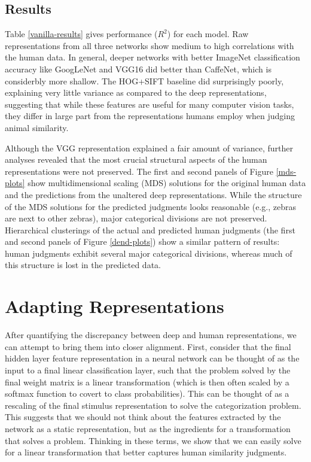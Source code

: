 \documentclass[10pt,letterpaper]{article}
\begin{document}
\subsection{Results} Table \ref{vanilla-results} gives performance ($R^{2}$) for each model. Raw representations from all three networks show medium to high correlations with the human data. In general, deeper networks with better ImageNet classification accuracy like GoogLeNet and VGG16 did better than CaffeNet, which is considerbly more shallow. The HOG+SIFT baseline did surprisingly poorly, explaining very little variance as compared to the deep representations, suggesting that while these features are useful for many computer vision tasks, they differ in large part from the representations humans employ when judging animal similarity.

Although the VGG representation explained a fair amount of variance, further analyses revealed that the most crucial structural aspects of the human representations were not preserved. The first and second panels of Figure \ref{mds-plots} show multidimensional scaling (MDS) solutions for the original human data and the predictions from the unaltered deep representations. While the structure of the MDS solutions for the predicted judgments looks reasonable (e.g., zebras are next to other zebras), major categorical divisions are not preserved. Hierarchical clusterings of the actual and predicted human judgments (the first and second panels of Figure \ref{dend-plots}) show a similar pattern of results: human judgments exhibit several major categorical divisions, whereas much of this structure is lost in the predicted data.

\section{Adapting Representations}
After quantifying the discrepancy between deep and human representations, we can attempt to bring them into closer alignment. First, consider that the final hidden layer feature representation in a neural network can be thought of as the input to a final linear classification layer, such that the problem solved by the final weight matrix is a linear transformation (which is then often scaled by a softmax function to covert to class probabilities). This can be thought of as a rescaling of the final stimulus representation to solve the categorization problem. This suggests that we should not think about the features extracted by the network as a static representation, but as the ingredients for a transformation that solves a problem. Thinking in these terms, we show that we can easily solve for a linear transformation that better captures human similarity judgments. \\
\end{document}

